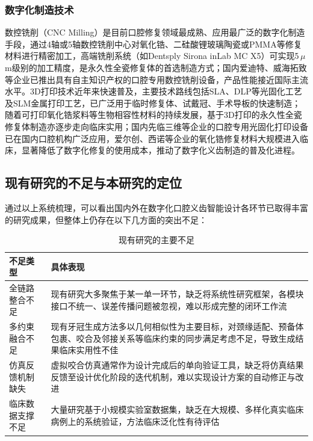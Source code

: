 \documentclass[12pt,hyperref,a4paper,UTF8]{ctexart}
\begin{document}
\subsubsection{数字化制造技术}

数控铣削（CNC Milling）是目前口腔修复领域最成熟、应用最广泛的数字化制造手段，通过4轴或5轴数控铣削中心对氧化锆、二硅酸锂玻璃陶瓷或PMMA等修复材料进行精密加工，高端铣削系统（如Dentsply Sirona inLab MC X5）可实现5\,$\mu$m级别的加工精度，是永久性全瓷修复体的首选制造方式；国内爱迪特、威海拓致等企业已推出具有自主知识产权的口腔专用数控铣削设备，产品性能接近国际主流水平。3D打印技术近年来快速普及，主要技术路线包括SLA、DLP等光固化工艺及SLM金属打印工艺，已广泛用于临时修复体、试戴冠、手术导板的快速制造；随着可打印氧化锆浆料等生物相容性材料的持续发展，基于3D打印的永久性全瓷修复体制造亦逐步走向临床实用；国内先临三维等企业的口腔专用光固化打印设备已在国内口腔机构广泛应用，爱尔创、西诺等企业的氧化锆修复材料大规模进入临床，显著降低了数字化修复的使用成本，推动了数字化义齿制造的普及化进程。

\subsection{现有研究的不足与本研究的定位}

通过以上系统梳理，可以看出国内外在数字化口腔义齿智能设计各环节已取得丰富的研究成果，但整体上仍存在以下几方面的突出不足：

\begin{table}[!htbp]
    \centering
    \caption{现有研究的主要不足}
    \label{tab:research_gap}
    \renewcommand{\arraystretch}{1.6}
    \begin{tabularx}{\textwidth}{
        >{\centering\arraybackslash}p{3.2cm}
        >{\raggedright\arraybackslash}X
    }
    \hline
    \textbf{不足类型} & \textbf{具体表现} \\
    \hline
    全链路整合不足
      & 现有研究大多聚焦于某一单一环节，缺乏将系统性研究框架，各模块接口不统一、误差传播问题被忽视，难以形成完整的闭环工作流 \\
    多约束融合不足
      & 现有牙冠生成方法多以几何相似性为主要目标，对颈缘适配、预备体包裹、咬合及邻接关系等临床约束的同步满足考虑不足，导致生成结果临床实用性不佳 \\
    仿真反馈机制缺失
      & 虚拟咬合仿真通常作为设计完成后的单向验证工具，缺乏将仿真结果反馈至设计优化阶段的迭代机制，难以实现设计方案的自动修正与改进 \\
    临床数据支撑不足
      & 大量研究基于小规模实验室数据集，缺乏在大规模、多样化真实临床病例上的系统验证，方法临床泛化性有待评估 \\
    \hline
    \end{tabularx}
\end{table}
\end{document}
